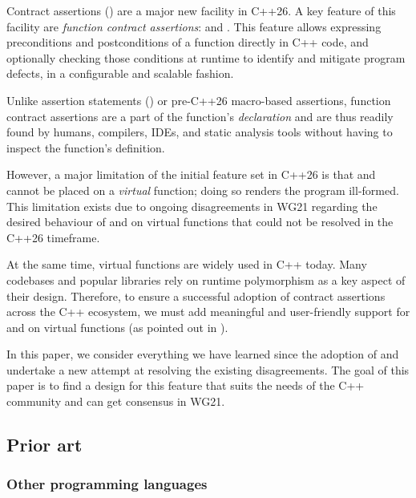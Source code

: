 Contract assertions (\cite{P2900R14}) are a major new facility in C++26. A key feature of this facility are \emph{function contract assertions}:  and . This feature allows expressing
preconditions and postconditions of a function directly in C++ code, and optionally checking those conditions at runtime to identify and mitigate program defects, in a configurable and scalable fashion. 

Unlike assertion statements () or pre-C++26 macro-based assertions, function contract assertions are a part of the function's \emph{declaration} and are thus readily found by humans, compilers, IDEs, and static analysis tools without having to inspect the function's definition. 

However, a major limitation of the initial feature set in C++26 is that  and  cannot be placed on a \emph{virtual} function; doing so renders the program ill-formed. This limitation exists due to ongoing disagreements in WG21 regarding the desired behaviour of  and  on virtual functions that could not be resolved in the C++26 timeframe.

At the same time, virtual functions are widely used in C++ today. Many codebases and popular libraries rely on runtime polymorphism as a key aspect of their design. Therefore, to ensure a successful adoption of contract assertions across the C++ ecosystem, we must add meaningful and user-friendly support for  and  on virtual functions (as pointed out in \cite{P3173R0}).

In this paper, we consider everything we have learned since the adoption of \cite{P2900R14} and undertake a new attempt at resolving the existing disagreements. The goal of this paper is to find a design for this feature that suits the needs of the C++ community and can get consensus in WG21.

\subsection{Prior art}

\subsubsection{Other programming languages}


